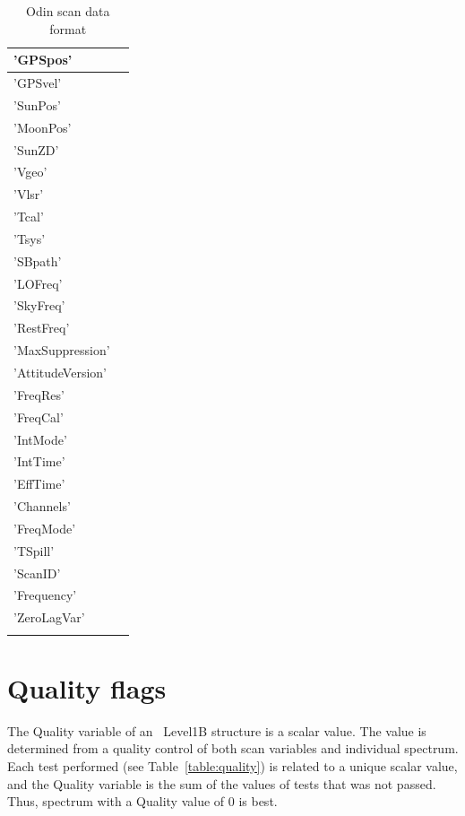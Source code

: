 \begin{longtable}{| p{} | p{} |}
     'GPSpos'          & \\ \hline
     'GPSvel'         & \\ \hline
     'SunPos'          & \\ \hline
     'MoonPos'        & \\ \hline
     'SunZD'           & \\ \hline
     'Vgeo'           & \\ \hline
     'Vlsr'            & \\ \hline
     'Tcal'          & \\ \hline
     'Tsys'           & \\ \hline
     'SBpath'          & \\ \hline
     'LOFreq'          & \\ \hline
     'SkyFreq'        & \\ \hline
     'RestFreq'      & \\ \hline
     'MaxSuppression' & \\ \hline
     'AttitudeVersion' & \\  \hline
     'FreqRes'        & \\ \hline
     'FreqCal'         & \\ \hline
     'IntMode'       & \\ \hline
     'IntTime'         & \\ \hline
     'EffTime'         & \\ \hline
     'Channels'       & \\ \hline
     'FreqMode'       & \\ \hline
     'TSpill'         & \\ \hline
     'ScanID'         & \\ \hline
     'Frequency'      & \\ \hline
     'ZeroLagVar'     & \\ \hline
\hline
\caption{ Odin scan data format}
\label{table:dataformat}
\end{longtable}



\section{Quality flags}

The Quality variable of an \smr\ Level1B structure is a scalar value.
The value is determined from a quality control
of both scan variables and individual spectrum.
Each test performed (see Table~\ref{table:quality}) is related to a unique scalar value,
and the Quality variable is the sum of the values of tests 
that was not passed.  
Thus, spectrum with a Quality value of 0 is best.


